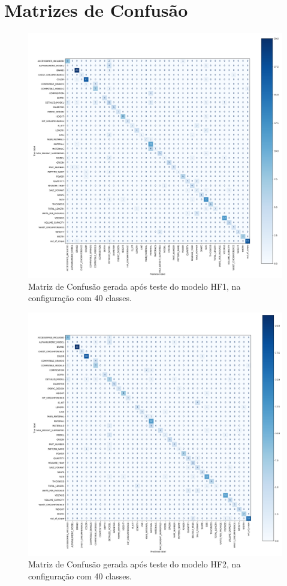 \chapter{Matrizes de Confusão}
\label{ap:matrizes_de_confusao}

\begin{figure}[!ht]
    \centering
	\includegraphics[width=1\linewidth]{figuras/HF1.png}
	\caption{Matriz de Confusão gerada após teste do modelo HF1, na configuração com 40 classes.}
	\label{fig:matriz_hf1}
\end{figure}

\begin{figure}[!ht]
    \centering
	\includegraphics[width=1\linewidth]{figuras/HF2.png}
	\caption{Matriz de Confusão gerada após teste do modelo HF2, na configuração com 40 classes.}
	\label{fig:matriz_hf2}
\end{figure}

